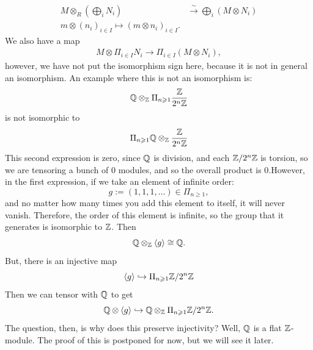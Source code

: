 \documentclass{article}
\begin{document}
\begin{ex}
    \begin{align*}
        M \otimes_{R} (\bigoplus_{i} N_{i}) &\xrightarrow{\sim} \bigoplus_{i} (M\otimes N_{i})\\
        m \otimes (n_{i})_{i \in I} \mapsto (m \otimes n_{i})_{i \in I}.
    \end{align*}
    We also have a map
    \begin{align*}
        M \otimes \Pi_{i \in I} N_{i} \rightarrow \Pi_{i \in I} (M \otimes N_{i}),
    \end{align*}
    however, we have not put the isomorphism sign here, because it is not in general an isomorphism. An example where this is not an isomorphism is: 
    \begin{align*}
        \mathbb{Q} \otimes_{\mathbb{Z}} \Pi_{n\geqslant 1} \frac{\mathbb{Z}}{2^{n}\mathbb{Z}}
    \end{align*}
    is not isomorphic to \begin{align*}
        \Pi_{n \geqslant 1} \mathbb{Q} \otimes_{\mathbb{Z}} \frac{\mathbb{Z}}{2^{n}\mathbb{Z}}
    \end{align*}
    This second expression is zero, since $\mathbb{Q}$ is division, and each $\mathbb{Z} / 2^{n}\mathbb{Z}$ is torsion, so we are tensoring a bunch of $0$ modules, and so the overall product is $0$.\gap However, in the first expression, if we take an element of infinite order: \[ g := (1,1,1,\dots) \in \Pi_{n \geq 1},\] and no matter how many times you add this element to itself, it will never vanish. Therefore, the order of this element is infinite, so the group that it generates is isomorphic to $\mathbb{Z}$. Then \[ \mathbb{Q} \otimes_{\mathbb{Z}} \langle g \rangle \cong \mathbb{Q}. \] But, there is an injective map \[\langle g \rangle \hookrightarrow \Pi_{n \geqslant 1} \mathbb{Z}/2^{n}\mathbb{Z}\] Then we can tensor with $\mathbb{Q}$ to get \[ \mathbb{Q} \otimes \langle g \rangle \hookrightarrow \mathbb{Q} \otimes_{\mathbb{Z}} \Pi_{n \geqslant 1} \mathbb{Z} / 2^{n}\mathbb{Z}.\] The question, then, is why does this preserve injectivity? Well, $\mathbb{Q}$ is a flat $\mathbb{Z}$-module. The proof of this is postponed for now, but we will see it later.
\end{ex}
\end{document}
